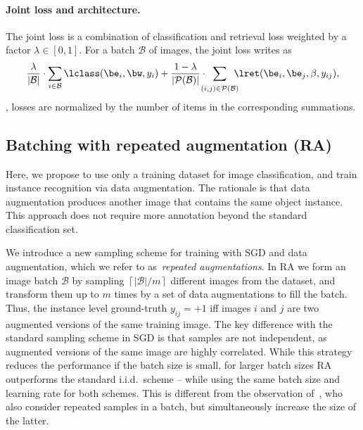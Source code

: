 \paragraph{Joint loss and architecture.}

The joint loss is a combination
of classification and retrieval loss weighted by a factor $\lambda \in [0, 1]$.
For a batch $\mathcal{B}$ of images, the joint loss writes as
\begin{equation}\label{eq:joint}
\frac{\lambda}{|\mathcal{B}|}\cdot\sum_{i\in\mathcal{B}}
\lclass(\be_i,\bw,y_i)
+
\frac{1-\lambda}{|\mathcal{P}(\mathcal{B})|}
\cdot\hspace{-1em}
\sum_{\raisebox{-3pt}{
$\scriptstyle(i,j)\in\mathcal{P}(\mathcal{B})$
}}
\hspace{-1em}
\lret(\be_i, \be_j, \beta, y_{ij}),
\end{equation}
\ie, losses are normalized by the number of items in the corresponding summations.


%
%
%

\subsection{Batching with repeated augmentation (RA)\label{sec:data-augmented-batches}}

%
%
Here, we propose to use only a training dataset for image classification, and train instance recognition via data augmentation.
%
The rationale is that data augmentation produces another image that contains the same object instance.
This approach does not require more annotation beyond the standard classification set.

%
%

%
%
%

We introduce a new sampling scheme for training with SGD and data augmentation, which we refer to as~\emph{repeated augmentations}.
In RA we form an image batch $\mathcal{B}$ by sampling $\left\lceil|\mathcal{B}|/m\right\rceil$ different images from the dataset, and transform them up to $m$ times by a set of data augmentations to fill the batch. 
Thus, the instance level ground-truth $y_{ij}=+1$ iff images $i$ and $j$ are two augmented versions of the same training image.
%
The key difference with the standard sampling scheme in SGD is that samples are not independent, as augmented versions of the same image are highly correlated. 
%
%
While this strategy reduces the performance if the batch size is small, for larger batch sizes RA outperforms the standard i.i.d.~scheme -- while using the same batch size and learning rate for both schemes.
This is different from the observation of~\cite{2019arXiv190109335H}, who also consider repeated samples in a batch, but simultaneously increase the size of the latter.

